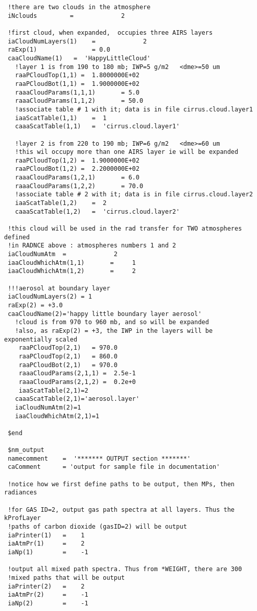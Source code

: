 \documentclass[12pt]{article}
\begin{document}
\begin{scriptsize}
\begin{verbatim}
 !there are two clouds in the atmosphere
 iNclouds         =             2

 !first cloud, when expanded,  occupies three AIRS layers
 iaCloudNumLayers(1)    =             2
 raExp(1)               = 0.0
 caaCloudName(1)   =  'HappyLittleCloud'
   !layer 1 is from 190 to 180 mb; IWP=5 g/m2   <dme>=50 um
   raaPCloudTop(1,1) =  1.8000000E+02
   raaPCloudBot(1,1) =  1.9000000E+02
   raaaCloudParams(1,1,1)       = 5.0  
   raaaCloudParams(1,1,2)       = 50.0  
   !associate table # 1 with it; data is in file cirrus.cloud.layer1
   iaaScatTable(1,1)    =  1
   caaaScatTable(1,1)   =  'cirrus.cloud.layer1'

   !layer 2 is from 220 to 190 mb; IWP=6 g/m2   <dme>=60 um
   !this wil occupy more than one AIRS layer ie will be expanded
   raaPCloudTop(1,2) =  1.9000000E+02
   raaPCloudBot(1,2) =  2.2000000E+02
   raaaCloudParams(1,2,1)       = 6.0  
   raaaCloudParams(1,2,2)       = 70.0  
   !associate table # 2 with it; data is in file cirrus.cloud.layer2
   iaaScatTable(1,2)    =  2
   caaaScatTable(1,2)   =  'cirrus.cloud.layer2'

 !this cloud will be used in the rad transfer for TWO atmospheres defined
 !in RADNCE above : atmospheres numbers 1 and 2
 iaCloudNumAtm  =             2
 iaaCloudWhichAtm(1,1)       =     1
 iaaCloudWhichAtm(1,2)       =     2

 !!!aerosol at boundary layer
 iaCloudNumLayers(2) = 1
 raExp(2) = +3.0
 caaCloudName(2)='happy little boundary layer aerosol'
   !cloud is from 970 to 960 mb, and so will be expanded
   !also, as raExp(2) = +3, the IWP in the layers will be exponentially scaled
    raaPCloudTop(2,1)   = 970.0
    raaPCloudTop(2,1)   = 860.0
    raaPCloudBot(2,1)   = 970.0
    raaaCloudParams(2,1,1) =  2.5e-1
    raaaCloudParams(2,1,2) =  0.2e+0
    iaaScatTable(2,1)=2
   caaaScatTable(2,1)='aerosol.layer' 
   iaCloudNumAtm(2)=1
   iaaCloudWhichAtm(2,1)=1

 $end

 $nm_output
 namecomment    =  '******* OUTPUT section *******'
 caComment      = 'output for sample file in documentation'

 !notice how we first define paths to be output, then MPs, then radiances

 !for GAS ID=2, output gas path spectra at all layers. Thus the kProfLayer 
 !paths of carbon dioxide (gasID=2) will be output
 iaPrinter(1)   =    1
 iaAtmPr(1)     =    2
 iaNp(1)        =    -1

 !output all mixed path spectra. Thus from *WEIGHT, there are 300 
 !mixed paths that will be output
 iaPrinter(2)   =    2
 iaAtmPr(2)     =    -1
 iaNp(2)        =    -1


\end{verbatim}
\end{scriptsize}
\end{document}
